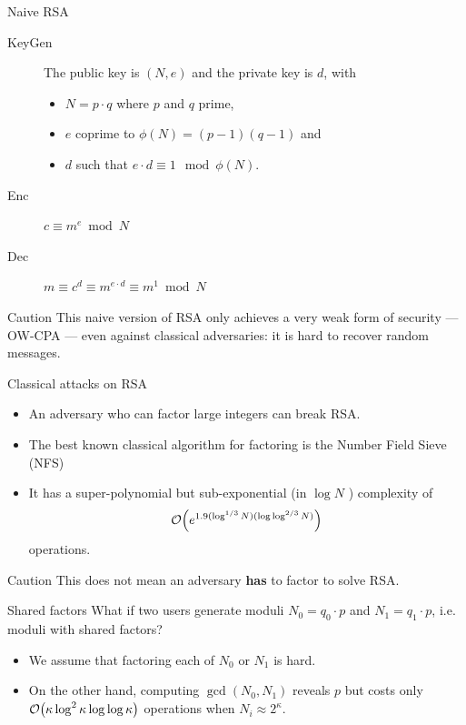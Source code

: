 \documentclass[presentation,smaller]{beamer}
\begin{document}
\begin{frame}[label={sec:orgfc8c7c6}]{Naive RSA}
\begin{description}
\item[{KeyGen}] The public key is \((N,e)\) and the private key is \(d\), with

\begin{itemize}
\item \(N = p \cdot q\) where \(p\) and \(q\) prime,
\item \(e\) coprime to \(\phi(N) = (p-1)(q-1)\) and
\item \(d\) such that \(e \cdot d \equiv 1 \mod{\phi(N)}\).
\end{itemize}

\item[{Enc}] \(c \equiv m^e \bmod{N}\)

\item[{Dec}] \(m \equiv c^d \equiv m^{e \cdot d} \equiv m^{1} \bmod{N}\)
\end{description}

\begin{block}{Caution}
This naive version of RSA only achieves a very weak form of security — OW-CPA — even against classical adversaries: it is hard to recover random messages.
\end{block}
\end{frame}

\begin{frame}[label={sec:org6dae885}]{Classical attacks on RSA}
\begin{itemize}
\item An adversary who can factor large integers can break RSA.

\item The best known classical algorithm for factoring is the Number Field Sieve (NFS)

\item It has a \alert{super-polynomial} but \alert{sub-exponential} (in \(\log N\) ) complexity of \[\bigO{e^{1.9 (\log^{1/3} N) (\log\log^{2/3}N)}}\] operations.
\end{itemize}


\pause

\begin{block}{Caution}
This does not mean an adversary \textbf{has} to factor to solve RSA.
\end{block}
\end{frame}

\begin{frame}[label={sec:org48cc41e}]{Shared factors}
What if two users generate moduli \(N_0 = q_0 ⋅ p\) and \(N_1 = q_1 \cdot p\), i.e. moduli with shared factors?

\begin{itemize}
\item We assume that factoring each of \(N_0\) or \(N_1\) is hard.
\item On the other hand, computing \(\gcd(N_0, N_1)\) reveals \(p\) but costs only \(\bigO{\kappa \log^2 \kappa \log \log \kappa}\) operations when \(N_i \approx 2^\kappa\).
\end{itemize}
\end{frame}
\end{document}
